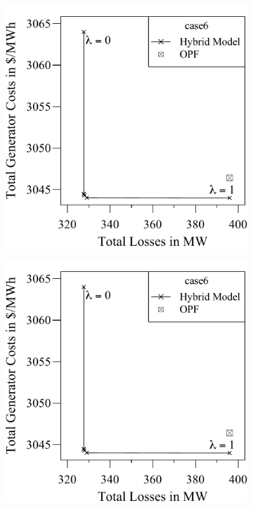 \begin{figure}[t!]
\begin{subfigure}[t]{.45\textwidth}
    \centering
        \includegraphics[width=0.95\linewidth, page=6,trim=0cm 0cm 0cm 0cm]{factsplacement/plots/plotCostsVsLosses.pdf}
    \label{ch:appendix:sec:facts:fig:plot-costs-losses-case57}
\end{subfigure}
\hfill
\begin{subfigure}[b]{.45\textwidth}
    \centering
        \includegraphics[width=0.95\linewidth, page=7,trim=0cm 0cm 0cm 0cm]{factsplacement/plots/plotCostsVsLosses.pdf}

\end{subfigure}
\end{figure}
